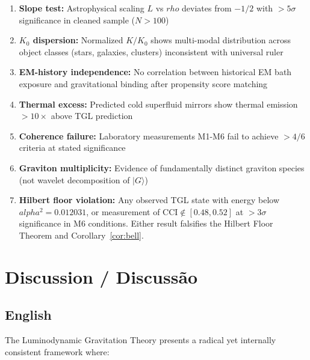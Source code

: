 \documentclass[12pt,a4paper]{article}
\def\alpha{alpha}%
\def\rho{rho}%
\begin{document}
\begin{enumerate}
    \item[\textbf{(R1)}] \textbf{Slope test:} Astrophysical scaling $L$ vs $\rho$ deviates from $-1/2$ with $>5\sigma$ significance in cleaned sample ($N > 100$)
    
    \item[\textbf{(R2)}] \textbf{$K_0$ dispersion:} Normalized $K/K_0$ shows multi-modal distribution across object classes (stars, galaxies, clusters) inconsistent with universal ruler
    
    \item[\textbf{(R3)}] \textbf{EM-history independence:} No correlation between historical EM bath exposure and gravitational binding after propensity score matching
    
    \item[\textbf{(R4)}] \textbf{Thermal excess:} Predicted cold superfluid mirrors show thermal emission $>10\times$ above TGL prediction
    
    \item[\textbf{(R5)}] \textbf{Coherence failure:} Laboratory measurements M1-M6 fail to achieve $>4/6$ criteria at stated significance
    
    \item[\textbf{(R6)}] \textbf{Graviton multiplicity:} Evidence of fundamentally distinct graviton species (not wavelet decomposition of $|G\rangle$)

    \item[\textbf{(R7)}] \textbf{Hilbert floor violation:} Any observed TGL state with energy below $\alpha^2 = 0.012031$, or measurement of $\mathrm{CCI} \notin [0.48, 0.52]$ at $> 3\sigma$ significance in M6 conditions. Either result falsifies the Hilbert Floor Theorem and Corollary~\ref{cor:bell}.
\end{enumerate}

\section{Discussion / Discussão}

\subsection{English}

The Luminodynamic Gravitation Theory presents a radical yet internally consistent framework where:
\end{document}

